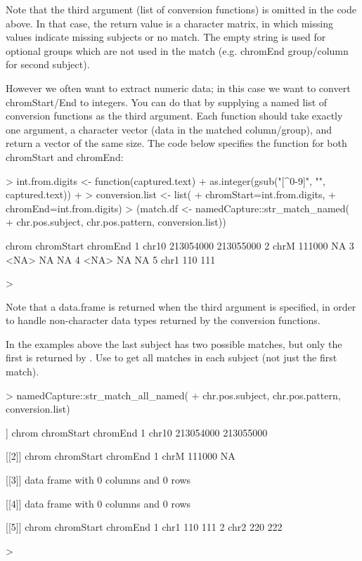 Note that the third argument (list of conversion functions) is omitted
in the code above. In that case, the return value is a character
matrix, in which missing values indicate missing subjects or no
match. The empty string is used for optional groups which are not used
in the match (e.g. chromEnd group/column for second subject).

However we often want to extract numeric data; in this case we want to
convert chromStart/End to integers. You can do that by supplying a
named list of conversion functions as the third argument. Each
function should take exactly one argument, a character vector (data in
the matched column/group), and return a vector of the same size. The
code below specifies the  function for both chromStart
and chromEnd:

\begin{Schunk}
\begin{Sinput}
> int.from.digits <- function(captured.text){
+   as.integer(gsub("[^0-9]", "", captured.text))
+ }
> conversion.list <- list(
+   chromStart=int.from.digits,
+   chromEnd=int.from.digits)
> (match.df <- namedCapture::str_match_named(
+   chr.pos.subject, chr.pos.pattern, conversion.list))
\end{Sinput}
\begin{Soutput}
  chrom chromStart  chromEnd
1 chr10  213054000 213055000
2  chrM     111000        NA
3  <NA>         NA        NA
4  <NA>         NA        NA
5  chr1        110       111
\end{Soutput}
\begin{Sinput}
> 
\end{Sinput}
\end{Schunk}

Note that a data.frame is returned when the third argument is
specified, in order to handle non-character data types returned by the
conversion functions.

In the examples above the last subject has two possible
matches, but only the first is returned by . Use
 to get all matches in each subject (not just the
first match).

\begin{Schunk}
\begin{Sinput}
> namedCapture::str_match_all_named(
+   chr.pos.subject, chr.pos.pattern, conversion.list)
\end{Sinput}
\begin{Soutput}
[[1]]
  chrom chromStart  chromEnd
1 chr10  213054000 213055000

[[2]]
  chrom chromStart chromEnd
1  chrM     111000       NA

[[3]]
data frame with 0 columns and 0 rows

[[4]]
data frame with 0 columns and 0 rows

[[5]]
  chrom chromStart chromEnd
1  chr1        110      111
2  chr2        220      222
\end{Soutput}
\begin{Sinput}
> 
\end{Sinput}
\end{Schunk}

